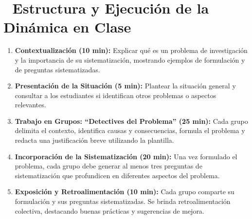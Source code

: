 \documentclass[12pt,a4paper]{article}
\begin{document}
\section*{💬 Estructura y Ejecución de la Dinámica en Clase}
\begin{enumerate}[label=\textbf{\arabic*.}, noitemsep]
    \item \textbf{Contextualización (10 min):} Explicar qué es un problema de investigación y la importancia de su sistematización, mostrando ejemplos de formulación y de preguntas sistematizadas.
    \item \textbf{Presentación de la Situación (5 min):} Plantear la situación general y consultar a los estudiantes si identifican otros problemas o aspectos relevantes.
    \item \textbf{Trabajo en Grupos: ``Detectives del Problema'' (25 min):} Cada grupo delimita el contexto, identifica causas y consecuencias, formula el problema y redacta una justificación breve utilizando la plantilla.
    \item \textbf{Incorporación de la Sistematización (20 min):} Una vez formulado el problema, cada grupo debe generar al menos tres preguntas de sistematización que profundicen en diferentes aspectos del problema.
    \item \textbf{Exposición y Retroalimentación (10 min):} Cada grupo comparte su formulación y sus preguntas sistematizadas. Se brinda retroalimentación colectiva, destacando buenas prácticas y sugerencias de mejora.
\end{enumerate}
\end{document}
